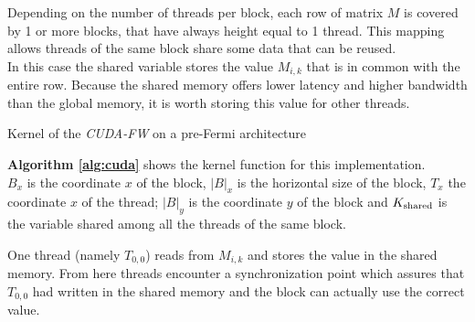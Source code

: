 Depending on the number of threads per block, each row  of matrix $M$ is covered by 1 or more blocks, that
have always height equal to 1 thread. This mapping allows threads of the same block share some data that can be reused. \\
In this case the shared variable stores the value $M_{i,k}$ that is in common with the entire row. Because the 
shared memory offers lower latency and higher bandwidth than the global memory, it is worth storing this value
for other threads.

\begin{algorithm}[h!]

\SetAlgoLined
\DontPrintSemicolon
  


\;

 
\caption{Kernel of the \emph{CUDA-FW} on a pre-Fermi architecture}\label{alg:cuda}
\end{algorithm}

\textbf{Algorithm \ref*{alg:cuda}} shows the kernel function for this implementation. \\
$B_x$ is the coordinate $x$ of the block, $\left|B\right|_x$ is the horizontal size of the block, $T_x$ the 
coordinate $x$ of the thread; $\left|B\right|_y$ is the coordinate $y$ of the block and $K_{\textnormal{shared}}$ is the variable
shared among all the threads of the same block.

One thread (namely $T_{0,0}$) reads from $M_{i,k}$ and stores the value in the shared memory. From here threads encounter a synchronization point which
assures that $T_{0,0}$ had written in the shared memory and the block can actually use the correct value.

